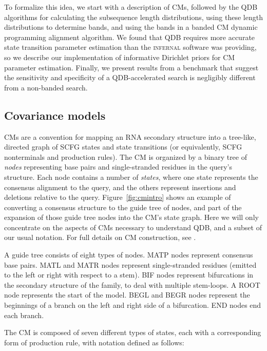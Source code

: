 \documentclass[11pt]{article}
\newif\ifdraft
\begin{document}
To formalize this idea, we start with a description of CMs, followed
by the QDB algorithms for calculating the subsequence length
distributions, using these length distributions to determine bands,
and using the bands in a banded CM dynamic programming alignment
algorithm.  We found that QDB requires more accurate state transition
parameter estimation than the \textsc{infernal} software was
providing, so we describe our implementation of informative Dirichlet
priors for CM parameter estimation. Finally, we present results from a
benchmark that suggest the sensitivity and specificity of a QDB-accelerated
search is negligibly different from a non-banded search.

\subsection{Covariance models}

CMs are a convention for mapping an RNA secondary structure into a
tree-like, directed graph of SCFG states and state transitions (or
equivalently, SCFG nonterminals and production rules). The CM is
organized by a binary tree of \emph{nodes} representing base pairs and
single-stranded residues in the query's structure. Each node contains
a number of \emph{states}, where one state represents the consensus alignment
to the query, and the others represent insertions and deletions
relative to the query.  Figure~\ref{fig:cmintro} shows an example of
converting a consensus structure to the guide tree of nodes, and part
of the expansion of those guide tree nodes into the CM's state graph.
Here we will only concentrate on the aspects of CMs necessary to
understand QDB, and a subset of our usual notation. For full details
on CM construction, see \cite{Eddy02b,infguide03}.

\ifdraft

\fi

A guide tree consists of eight types of nodes. MATP nodes represent
consensus base pairs. MATL and MATR nodes represent single-stranded
residues (emitted to the left or right with respect to a stem). BIF
nodes represent bifurcations in the secondary structure of the family,
to deal with multiple stem-loops. A ROOT node represents the start of
the model. BEGL and BEGR nodes represent the beginnings of a branch on
the left and right side of a bifurcation.  END nodes end each branch.

The CM is composed of seven different types of states, each with a
corresponding form of production rule, with notation defined as
follows:
\end{document}
